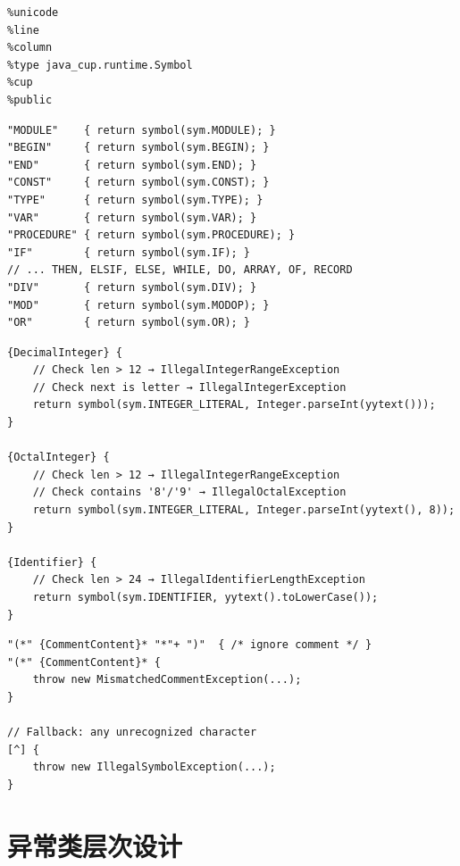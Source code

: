 \documentclass[12pt,a4paper,fontset=none]{ctexart}
\begin{document}
\begin{lstlisting}[style=flexcode,caption={oberon.flex — 选项段与词法状态}]
%class OberonScanner
%unicode
%line
%column
%type java_cup.runtime.Symbol
%cup
%public
\end{lstlisting}

\begin{lstlisting}[style=flexcode,caption={oberon.flex — 保留字规则（19 个）}]
"MODULE"    { return symbol(sym.MODULE); }
"BEGIN"     { return symbol(sym.BEGIN); }
"END"       { return symbol(sym.END); }
"CONST"     { return symbol(sym.CONST); }
"TYPE"      { return symbol(sym.TYPE); }
"VAR"       { return symbol(sym.VAR); }
"PROCEDURE" { return symbol(sym.PROCEDURE); }
"IF"        { return symbol(sym.IF); }
// ... THEN, ELSIF, ELSE, WHILE, DO, ARRAY, OF, RECORD
"DIV"       { return symbol(sym.DIV); }
"MOD"       { return symbol(sym.MODOP); }
"OR"        { return symbol(sym.OR); }
\end{lstlisting}

\begin{lstlisting}[style=flexcode,caption={oberon.flex — 整数与标识符规则}]
{DecimalInteger} {
    // Check len > 12 → IllegalIntegerRangeException
    // Check next is letter → IllegalIntegerException
    return symbol(sym.INTEGER_LITERAL, Integer.parseInt(yytext()));
}

{OctalInteger} {
    // Check len > 12 → IllegalIntegerRangeException
    // Check contains '8'/'9' → IllegalOctalException
    return symbol(sym.INTEGER_LITERAL, Integer.parseInt(yytext(), 8));
}

{Identifier} {
    // Check len > 24 → IllegalIdentifierLengthException
    return symbol(sym.IDENTIFIER, yytext().toLowerCase());
}
\end{lstlisting}

\begin{lstlisting}[style=flexcode,caption={oberon.flex — 注释与错误恢复}]
"(*" {CommentContent}* "*"+ ")"  { /* ignore comment */ }
"(*" {CommentContent}* {
    throw new MismatchedCommentException(...);
}

// Fallback: any unrecognized character
[^] {
    throw new IllegalSymbolException(...);
}
\end{lstlisting}

\section{异常类层次设计}
\end{document}
